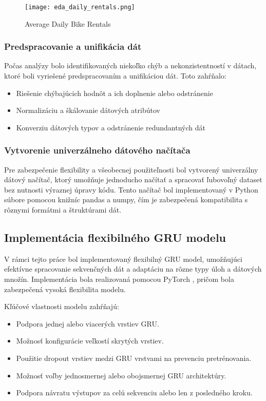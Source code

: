 \begin{figure}[ht!]
\centering
\texttt{[image: eda\_daily\_rentals.png]}
\caption{Average Daily Bike Rentals}\label{o:2}
\end{figure}

\newpage

\subsubsection{Predspracovanie a unifikácia dát}
Počas analýzy bolo identifikovaných niekoľko chýb a nekonzistentností v dátach, ktoré boli vyriešené predspracovaním a unifikáciou dát. Toto zahŕňalo:
\begin{itemize}
\item Riešenie chýbajúcich hodnôt a ich doplnenie alebo odstránenie
\item Normalizáciu a škálovanie dátových atribútov
\item Konverziu dátových typov a odstránenie redundantných dát
\end{itemize}

\subsubsection{Vytvorenie univerzálneho dátového načítača}
Pre zabezpečenie flexibility a všeobecnej použiteľnosti bol vytvorený univerzálny dátový načítač, ktorý umožňuje jednoducho načítať a spracovať ľubovoľný dataset bez nutnosti výraznej úpravy kódu. Tento načítač bol implementovaný v Python súbore pomocou knižníc pandas a numpy, čím je zabezpečená kompatibilita s rôznymi formátmi a štruktúrami dát.

\subsection{Implementácia flexibilného GRU modelu}
\label{sec:gru_model}
V rámci tejto práce bol implementovaný flexibilný GRU model, umožňujúci efektívne spracovanie sekvenčných dát a adaptáciu na rôzne typy úloh a dátových množín. Implementácia bola realizovaná pomocou PyTorch \cite{PyTorch}, pričom bola zabezpečená vysoká flexibilita modelu.

Kľúčové vlastnosti modelu zahŕňajú:
\begin{itemize}
\item Podpora jednej alebo viacerých vrstiev GRU.
\item Možnosť konfigurácie veľkostí skrytých vrstiev.
\item Použitie dropout vrstiev medzi GRU vrstvami na prevenciu pretrénovania.
\item Možnosť voľby jednosmernej alebo obojsmernej GRU architektúry.
\item Podpora návratu výstupov za celú sekvenciu alebo len z posledného kroku.
\end{itemize}

